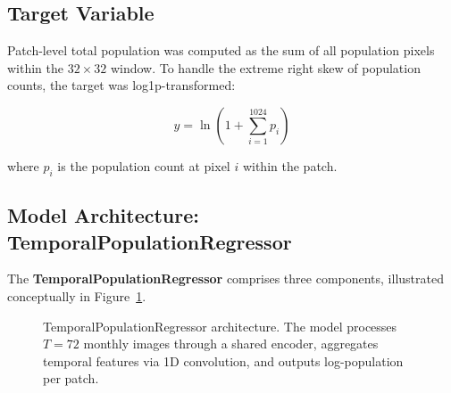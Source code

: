 \documentclass[12pt,a4paper]{article}
\begin{document}
\subsection{Target Variable}
\label{subsec:target}

Patch-level total population was computed as the sum of all population pixels within the $32 \times 32$ window. To handle the extreme right skew of population counts, the target was log1p-transformed:

\begin{equation}
y = \ln(1 + \sum_{i=1}^{1024} p_i)
\label{eq:log1p}
\end{equation}

where $p_i$ is the population count at pixel $i$ within the patch.

\subsection{Model Architecture: TemporalPopulationRegressor}
\label{subsec:architecture}

The \textbf{TemporalPopulationRegressor} comprises three components, illustrated conceptually in Figure~\ref{fig:architecture}.

\begin{figure}[H]
\centering
{}
\caption{TemporalPopulationRegressor architecture. The model processes $T=72$ monthly images through a shared encoder, aggregates temporal features via 1D convolution, and outputs log-population per patch.}
\label{fig:architecture}
\end{figure}
\end{document}
